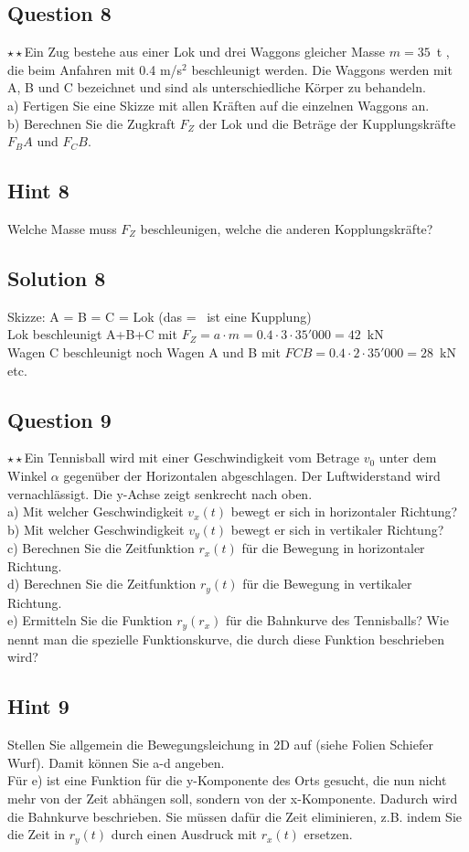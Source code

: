 \documentclass{article}
\begin{document}
\subsection*{Question 8}
$\star\star$Ein Zug bestehe aus einer Lok und drei Waggons gleicher Masse $m=35$~t , die beim Anfahren mit 0.4 m/s$^2$ beschleunigt werden. Die Waggons werden mit A, B und C bezeichnet und sind als unterschiedliche Körper zu behandeln.\\
a) Fertigen Sie eine Skizze mit allen Kräften auf die einzelnen Waggons an.\\
b) Berechnen Sie die Zugkraft $F_Z$ der Lok und die Beträge der Kupplungskräfte $F_BA$ und $F_CB$.
\subsection*{Hint 8}
Welche Masse muss $F_Z$ beschleunigen, welche die anderen Kopplungskräfte?
\subsection*{Solution 8}
Skizze: A = B = C = Lok (das \guillemotleft = \guillemotright\ ist eine Kupplung)\\
Lok beschleunigt A+B+C mit $F_Z= a \cdot m  = 0.4 \cdot 3 \cdot 35'000 = 42$~kN\\
Wagen C beschleunigt noch Wagen A und B mit $FCB = 0.4 \cdot 2 \cdot 35'000 = 28$~kN etc.
\subsection*{Question 9}
$\star\star$Ein Tennisball wird mit einer Geschwindigkeit vom Betrage $v_0$ unter dem Winkel $\alpha$ gegenüber der Horizontalen abgeschlagen. Der Luftwiderstand wird vernachlässigt. Die y-Achse zeigt senkrecht nach oben.\\
a) Mit welcher Geschwindigkeit $v_x(t)$ bewegt er sich in horizontaler Richtung?\\
b) Mit welcher Geschwindigkeit $v_y(t)$ bewegt er sich in vertikaler Richtung?\\
c) Berechnen Sie die Zeitfunktion $r_x(t)$ für die Bewegung in horizontaler Richtung. \\
d) Berechnen Sie die Zeitfunktion $r_y(t)$ für die Bewegung in vertikaler Richtung.\\
e) Ermitteln Sie die Funktion $r_y(r_x)$ für die Bahnkurve des Tennisballs? Wie nennt man die spezielle Funktionskurve, die durch diese Funktion beschrieben wird?
\subsection*{Hint 9}
Stellen Sie allgemein die Bewegungsleichung in 2D auf (siehe Folien Schiefer Wurf). Damit können Sie a-d angeben.\\
Für e) ist eine Funktion für die y-Komponente des Orts gesucht, die nun nicht mehr von der Zeit abhängen soll, sondern von der x-Komponente. Dadurch wird die Bahnkurve beschrieben. Sie müssen dafür die Zeit eliminieren, z.B. indem Sie die Zeit in $r_y(t)$ durch einen Ausdruck mit $r_x(t)$ ersetzen.
\end{document}
